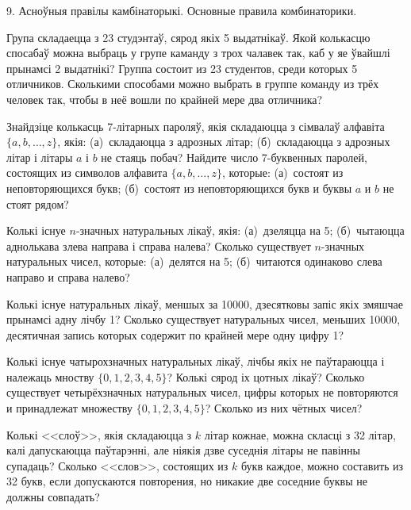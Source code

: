 



\biLangHeader
{9. Асноўныя правілы камбінаторыкі.}
{Основные правила комбинаторики.}

\begin{problemList}

\problemItemSimple
{Група складаецца з 23 студэнтаў, сярод якіх 5 выдатнікаў. Якой колькасцю спосабаў можна выбраць у групе каманду з трох чалавек так, каб у яе ўвайшлі прынамсі 2 выдатнікі?}
{Группа состоит из 23 студентов, среди которых 5 отличников. Сколькими способами можно выбрать в группе команду из трёх человек так, чтобы в неё вошли по крайней мере два отличника?}

\bigskip

\problemItemSimple
{Знайдзіце колькасць 7-літарных пароляў, якія складаюцца з сімвалаў алфавіта $\{a, b, \dots, z \}$, якія: (а)~складаюцца з адрозных літар; (б)~складаюцца з адрозных літар і літары $a$ і $b$ не стаяць побач?}
{Найдите число 7-буквенных паролей, состоящих из символов алфавита $\{a, b, \dots, z \}$, которые: (а)~состоят из неповторяющихся букв; (б)~состоят из неповторяющихся букв и буквы $a$ и $b$ не стоят рядом?}

\bigskip

\problemItemSimple
{Колькі існуе $n$-значных натуральных лікаў, якія: (а)~дзеляцца на 5; (б)~чытаюцца аднолькава злева направа і справа налева?}
{Сколько существует $n$-значных натуральных чисел, которые: (а)~делятся на 5; (б)~читаются одинаково слева направо и справа налево?}

\bigskip

\problemItemSimple
{Колькі існуе натуральных лікаў, меншых за 10000, дзесятковы запіс якіх змяшчае прынамсі адну лічбу 1?}
{Сколько существует натуральных чисел, меньших 10000, десятичная запись которых содержит по крайней мере одну цифру 1?}

\bigskip

\problemItemSimple
{Колькі існуе чатырохзначных натуральных лікаў, лічбы якіх не паўтараюцца і належаць мноству $\{0, 1, 2, 3, 4, 5\}$? Колькі сярод іх цотных лікаў?}
{Сколько существует четырёхзначных натуральных чисел, цифры которых не повторяются и принадлежат множеству $\{0, 1, 2, 3, 4, 5\}$? Сколько из них чётных чисел?}

\bigskip

\problemItemSimple
{Колькі <<слоў>>, якія складаюцца з $k$ літар кожнае, можна скласці з 32 літар, калі дапускаюцца паўтарэнні, але ніякія дзве суседнія літары не павінны супадаць?}
{Сколько <<слов>>, состоящих из $k$ букв каждое, можно составить из 32 букв, если допускаются повторения, но никакие две соседние буквы не должны совпадать?}


\end{problemList}
